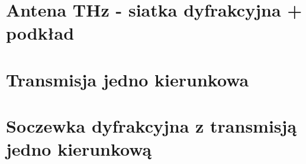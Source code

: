 

\section{Antena THz - siatka dyfrakcyjna + podkład}


\section{Transmisja jedno kierunkowa}
\section{Soczewka dyfrakcyjna z transmisją jedno kierunkową}

